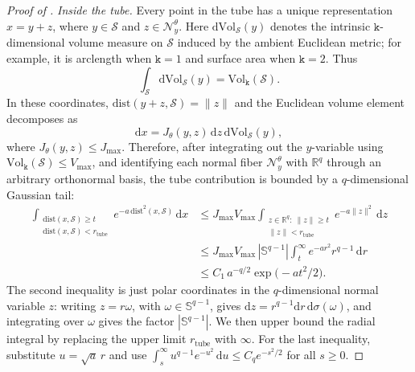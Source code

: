 \documentclass{article}
\theoremstyle{normaltheorem}
\newcommand{\ud}{\mathrm{d}}
\newcommand{\dimk}{\texttt{k}}
\newcommand{\R}{\mathbb{R}}
\newcommand{\calN}{\mathcal{N}}
\begin{document}
\begin{proof}[Proof of ]
\emph{Inside the tube.}
Every point in the tube has a unique representation \(x=y+z\), where \(y\in\mathcal S\) and
\(z\in\calN_y^\theta\). Here \(\ud\mathrm{Vol}_{\mathcal S}(y)\) denotes the intrinsic \(\dimk\)-dimensional volume
measure on \(\mathcal S\) induced by the ambient Euclidean metric; for example, it is arclength when \(\dimk=1\) and
surface area when \(\dimk=2\). Thus
\[
\int_{\mathcal S}\ud\mathrm{Vol}_{\mathcal S}(y)=\mathrm{Vol}_{\dimk}(\mathcal S).
\]
In these coordinates, \(\mathrm{dist}(y+z,\mathcal S)=\|z\|\) and the Euclidean volume element decomposes as
\[
\ud x=J_\theta(y,z)\,\ud z\,\ud\mathrm{Vol}_{\mathcal S}(y),
\]
where \(J_\theta(y,z)\le J_{\max}\). Therefore, after integrating out the \(y\)-variable using
\(\mathrm{Vol}_{\dimk}(\mathcal S)\le V_{\max}\), and identifying each normal fiber
\(\calN_y^\theta\) with \(\R^q\) through an arbitrary orthonormal basis, the tube contribution is bounded by a
\(q\)-dimensional Gaussian tail:
\begin{align}
\int_{\substack{\mathrm{dist}(x,\mathcal S)\ge t\\ \mathrm{dist}(x,\mathcal S)<r_{\mathrm{tube}}}}
e^{-a\,\mathrm{dist}^2(x,\mathcal S)}\,\ud x
&\le
J_{\max}V_{\max}
\int_{\substack{z\in\R^q:\ \|z\|\ge t\\ \|z\|<r_{\mathrm{tube}}}}
e^{-a\|z\|^2}\,\ud z \nonumber\\
&\le
J_{\max}V_{\max}\,|\mathbb S^{q-1}|
\int_t^\infty e^{-a r^2}r^{q-1}\,\ud r \nonumber\\
&\le C_1\,a^{-q/2}\exp\!\big(-a t^2/2\big).
\label{eq:gibbs-num-near}
\end{align}
The second inequality is just polar coordinates in the \(q\)-dimensional normal variable \(z\): writing
\(z=r\omega\), with \(\omega\in\mathbb S^{q-1}\), gives
\(\ud z=r^{q-1}\ud r\,\ud\sigma(\omega)\), and integrating over \(\omega\) gives the factor
\(|\mathbb S^{q-1}|\). We then upper bound the radial integral by replacing the upper limit
\(r_{\mathrm{tube}}\) with \(\infty\).
For the last inequality, substitute \(u=\sqrt a\,r\) and use
\(\int_s^\infty u^{q-1}e^{-u^2}\,\ud u\le C_q e^{-s^2/2}\) for all \(s\ge0\).


\end{proof}
\end{document}
